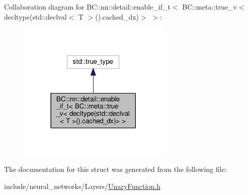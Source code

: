 Collaboration diagram for BC\+:\+:nn\+:\+:detail\+:\+:enable\+\_\+if\+\_\+t$<$ BC\+:\+:meta\+:\+:true\+\_\+v$<$ decltype(std\+:\+:declval$<$ T $>$().cached\+\_\+dx)$>$ $>$\+:
\nopagebreak
\begin{figure}[H]
\begin{center}
\leavevmode
\includegraphics[width=206pt]{structBC_1_1nn_1_1detail_1_1detect__cached__dx_3_01T_00_01std_1_1enable__if__t_3_01BC_1_1meta_1_f403101df8a233754778e99f5b6311d4}
\end{center}
\end{figure}


The documentation for this struct was generated from the following file\+:\begin{DoxyCompactItemize}
\item 
include/neural\+\_\+networks/\+Layers/\hyperlink{UnaryFunction_8h}{Unary\+Function.\+h}\end{DoxyCompactItemize}
